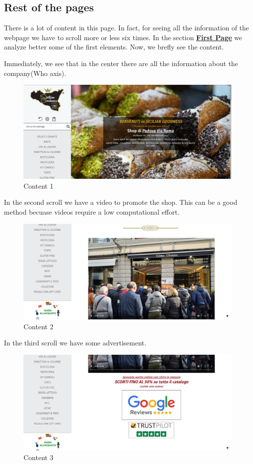 \pagebreak

\subsection{Rest of the pages}
There is a lot of content in this page. In fact, for seeing all the information of the webpage we have to scroll more or less six times.
In the section \textbf{\hyperlink{sho}{First Page}} we analyze better some of the first elements. Now, we brefly see the content.

Immediately, we see that in the center there are all the information about the company(Who axis).

\begin{figure}[H]
	\centering\includegraphics[width=12cm]{Img/con1.png}
	\caption{Content 1}
\end{figure}

In the second scroll we have a video to promote the shop. This can be a good method becuase videos require a low computational effort.

\begin{figure}[H]
	\centering\includegraphics[width=12cm]{Img/con2.png}
	\caption{Content 2}
\end{figure}

\pagebreak

In the third scroll we have some advertisement.

\begin{figure}[H]
	\centering\includegraphics[width=12cm]{Img/con3.png}
	\caption{Content 3}
\end{figure}

